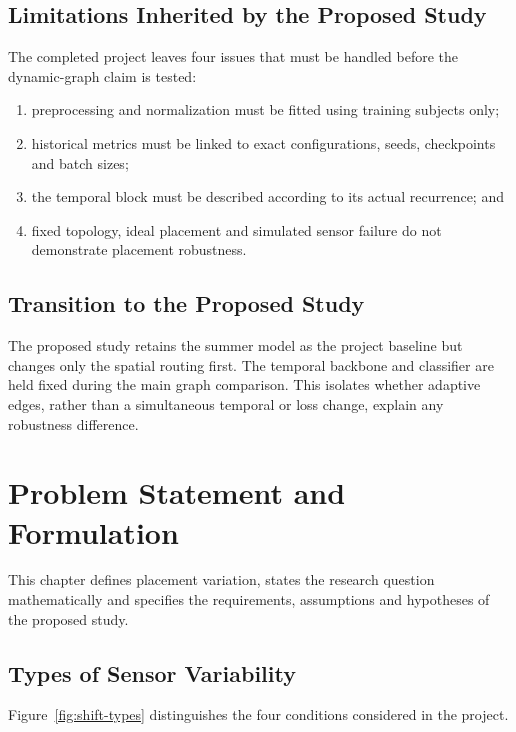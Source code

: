 \documentclass[12pt,a4paper,twoside,openright]{report}
\begin{document}
\section{Limitations Inherited by the Proposed Study}
The completed project leaves four issues that must be handled before the dynamic-graph claim is tested:
\begin{enumerate}
\item preprocessing and normalization must be fitted using training subjects only;
\item historical metrics must be linked to exact configurations, seeds, checkpoints and batch sizes;
\item the temporal block must be described according to its actual recurrence; and
\item fixed topology, ideal placement and simulated sensor failure do not demonstrate placement robustness.
\end{enumerate}

\section{Transition to the Proposed Study}
The proposed study retains the summer model as the project baseline but changes only the spatial routing first. The temporal backbone and classifier are held fixed during the main graph comparison. This isolates whether adaptive edges, rather than a simultaneous temporal or loss change, explain any robustness difference.

\cleardoublepage
\chapter[Problem Statement and Formulation]{Problem Statement and\\Formulation}

This chapter defines placement variation, states the research question mathematically and specifies the requirements, assumptions and hypotheses of the proposed study.

\section{Types of Sensor Variability}
Figure~\ref{fig:shift-types} distinguishes the four conditions considered in the project.
\end{document}
